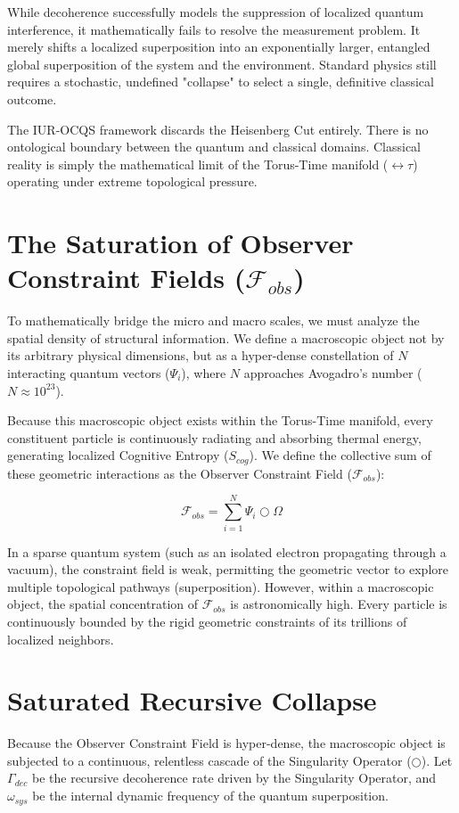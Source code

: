 \documentclass[12pt,openany]{book}
\begin{document}
While decoherence successfully models the suppression of localized quantum interference, it mathematically fails to resolve the measurement problem. It merely shifts a localized superposition into an exponentially larger, entangled global superposition of the system and the environment. Standard physics still requires a stochastic, undefined "collapse" to select a single, definitive classical outcome.

The IUR-OCQS framework discards the Heisenberg Cut entirely. There is no ontological boundary between the quantum and classical domains. Classical reality is simply the mathematical limit of the Torus-Time manifold ($\leftrightarrow\tau$) operating under extreme topological pressure.

\section{The Saturation of Observer Constraint Fields ($\mathcal{F}_{obs}$)}
To mathematically bridge the micro and macro scales, we must analyze the spatial density of structural information. We define a macroscopic object not by its arbitrary physical dimensions, but as a hyper-dense constellation of $N$ interacting quantum vectors ($\Psi_i$), where $N$ approaches Avogadro's number ($N \approx 10^{23}$).

Because this macroscopic object exists within the Torus-Time manifold, every constituent particle is continuously radiating and absorbing thermal energy, generating localized Cognitive Entropy ($S_{cog}$). We define the collective sum of these geometric interactions as the Observer Constraint Field ($\mathcal{F}_{obs}$):

\begin{equation}
\mathcal{F}_{obs} = \sum_{i=1}^N \Psi_i \bigcirc \Omega
\end{equation}

In a sparse quantum system (such as an isolated electron propagating through a vacuum), the constraint field is weak, permitting the geometric vector to explore multiple topological pathways (superposition). However, within a macroscopic object, the spatial concentration of $\mathcal{F}_{obs}$ is astronomically high. Every particle is continuously bounded by the rigid geometric constraints of its trillions of localized neighbors.

\section{Saturated Recursive Collapse}
Because the Observer Constraint Field is hyper-dense, the macroscopic object is subjected to a continuous, relentless cascade of the Singularity Operator ($\bigcirc$). Let $\Gamma_{dec}$ be the recursive decoherence rate driven by the Singularity Operator, and $\omega_{sys}$ be the internal dynamic frequency of the quantum superposition. 
\end{document}
